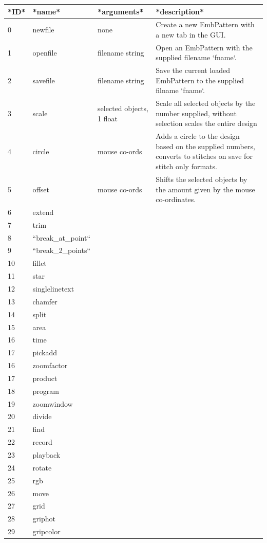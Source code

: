 \documentclass[10pt]{report}
\begin{document}
\begin{tabular}{llll}
*ID* & *name*  & *arguments* & *description* \\
\hline
0 & newfile & none & Create a new EmbPattern with a new tab in the GUI. \\
1 & openfile & filename string & Open an EmbPattern with the supplied filename `fname`. \\
2 & savefile & filename string & Save the current loaded EmbPattern to the supplied filname `fname`. \\
3 & scale & selected objects, 1 float & Scale all selected objects by the number supplied, without selection scales the entire design \\
4 & circle & mouse co-ords & Adds a circle to the design based on the supplied numbers, converts to stitches on save for stitch only formats. \\
5 & offset & mouse co-ords & Shifts the selected objects by the amount given by the mouse co-ordinates. \\
6 & extend & & \\
7 & trim & & \\
8 & ``break\_at\_point`` & & \\
9 & ``break\_2\_points`` & & \\
10 & fillet & & \\
11 & star & & \\
12 & singlelinetext & & \\
13 & chamfer & & \\
14 & split & & \\
15 & area & & \\
16 & time & & \\
17 & pickadd & & \\
16 & zoomfactor & & \\
17 & product & & \\
18 & program & & \\
19 & zoomwindow & & \\
20 & divide & & \\
21 & find & & \\
22 & record & & \\
23 & playback & & \\
24 & rotate & & \\
25 & rgb & & \\
26 & move & & \\
27 & grid & & \\
28 & griphot & & \\
29 & gripcolor & & \\

\end{tabular}
\end{document}
